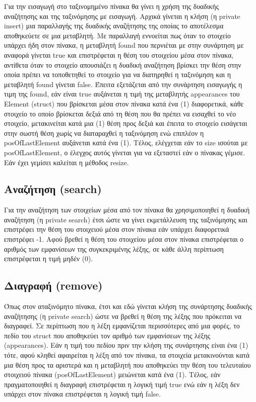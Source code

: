 Για την εισαγωγή στο ταξινομημένο πίνακα θα γίνει η χρήση της δυαδικής αναζήτησης και της ταξινόμησης με εισαγωγή. Αρχικά γίνεται η κλήση (η private insert) μια παραλλαγής της δυαδικής αναζήτησης της οποίας το αποτέλεσμα αποθηκεύετε σε μια μεταβλητή. Με παραλλαγή εννοείται πως όταν το στοιχείο υπάρχει ήδη στον πίνακα, η μεταβλητή found που περνιέται με στην συνάρτηση με αναφορά γίνεται true και επιστρέφεται η θέση του στοιχείου μέσα στον πίνακα, αντίθετα όταν το στοιχείο απουσιάζει η δυαδική αναζήτηση βρίσκει την θέση στην οποία πρέπει να τοποθετηθεί το στοιχείο για να διατηρηθεί η ταξινόμηση και η μεταβλητή found γίνεται false. Έπειτα εξετάζεται από την συνάρτηση εισαγωγής η τιμη της found, εάν είναι true αυξάνεται η τιμή της μεταβλητής appearances του Element (struct) που βρίσκεται μέσα στον πίνακα κατά ένα (1) διαφορετικά, κάθε στοιχείο το οποίο βρίσκεται δεξιά από τη θέση που θα πρέπει να εισαχθεί το νέο στοιχείο, μετακινείται κατά μια (1) θέση προς δεξιά και έπειτα το στοιχείο εισάγεται στην σωστή θέση χωρίς να διαταραχθεί η ταξινόμηση ενώ επιπλέον η posOfLastElement αυξάνεται κατά ένα (1). Τέλος, ελέγχεται εάν το size ισούται με posOfLastElement, ο έλεγχος αυτός γίνεται για να εξεταστεί εάν ο πίνακας γέμισε. Εάν έχει γεμίσει καλείται η  μέθοδος resize.

\subsection{Αναζήτηση (search)}

Για την αναζήτηση των στοιχείων μέσα από τον πίνακα θα χρησιμοποιηθεί η δυαδική αναζήτηση (η private search)  έτσι ώστε να γίνει εκμετάλλευση της ταξινόμησης και επιστρέφει την θέση του στοιχειού μέσα στον πίνακα εάν υπάρχει διαφορετικά επιστρέφει -1. Αφού βρεθεί η θέση του στοιχείου μέσα στον πίνακα επιστρέφεται ο αριθμός των εμφανίσεων της συγκεκριμένης λέξης, σε κάθε άλλη περίπτωση επιστρέφεται η τιμή μηδέν (0). 

\subsection{Διαγραφή (remove)}

Όπως στον αταξινόμητο πίνακα, έτσι και εδώ γίνεται κλήση της συνάρτησης δυαδικής αναζήτησης (η private search) ώστε να βρεθεί η θέση της λέξης που πρόκειται να διαγραφεί. Σε περίπτωση που η λέξη εμφανίζεται περισσότερες από μια φορές, το πεδίο του struct που αποθηκεύει τον αριθμό των εμφανίσεων της λέξης (appearances). Εάν η τιμή του πεδίου πριν την κλήση της συνάρτησης είναι ένα (1) τότε, αφού κληθεί αφαιρείται η λέξη από τον πίνακα, τα στοιχεία μετακινούνται κατά μια θέση προς τα αριστερά και η μεταβλητή που αποθηκεύει την θέση του τελευταίου στοιχειού πίνακα (posOfLastElement) μειώνεται κατά ένα (1). Τέλος, εάν πραγματοποιηθεί η διαγραφή επιστρέφεται η λογική τιμή true ενώ εάν η λέξη δεν υπάρχει στον πίνακα επιστρέφεται η λογική τιμή false.
